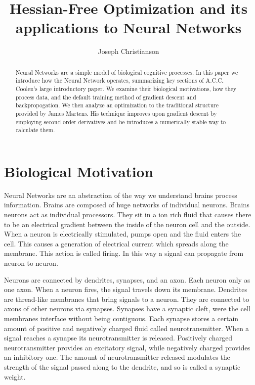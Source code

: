 \documentclass[]{article}
\title{Hessian-Free Optimization and its applications to Neural Networks}
\author{Joseph Christianson}
\theoremstyle{plain}
\theoremstyle{definition}
\begin{document}
\maketitle

\begin{abstract}
Neural Networks are a simple model of biological cognitive processes. In this paper we introduce how the Neural Network operates, summarizing key sections of A.C.C. Coolen's large introductory paper. We examine their biological motivations, how they process data, and the default training method of gradient descent and backpropogation. We then analyze an optimization to the traditional structure provided by James Martens. His technique improves upon gradient descent by employing second order derivatives and he introduces a numerically stable way to calculate them. 
\end{abstract}

\section{Biological Motivation}

Neural Networks are an abstraction of the way we understand brains process information. Brains are composed of huge networks of individual neurons. Brains neurons act as individual processors. They sit in a ion rich fluid that causes there to be an electrical gradient between the inside of the neuron cell and the outside. When a neuron is electrically stimulated, pumps open and the fluid enters the cell. This causes a generation of electrical current which spreads along the membrane. This action is called firing. In this way a signal can propagate from neuron to neuron.

Neurons are connected by dendrites, synapses, and an axon. Each neuron only as one axon. When a neuron fires, the signal travels down its membrane. Dendrites are thread-like membranes that bring signals to a neuron. They are connected to axons of other neurons via synapses. Synapses have a synaptic cleft, were the cell membranes interface without being contiguous. Each synapse stores a certain amount of positive and negatively charged fluid called neurotransmitter. When a signal reaches a synapse its neurotransmitter is released. Positively charged neurotransmitter provides an excitatory signal, while negatively charged provides an inhibitory one. The amount of neurotransmitter released modulates the strength of the signal passed along to the dendrite, and so is called a synaptic weight.
\end{document}
